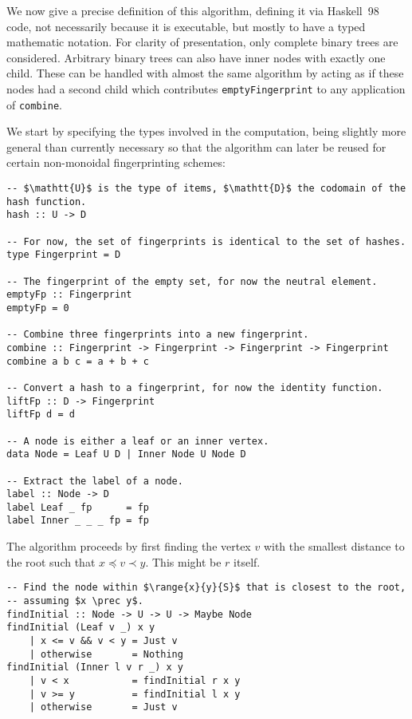 We now give a precise definition of this algorithm, defining it via Haskell~98~\cite{jones2003haskell} code, not necessarily because it is executable, but mostly to have a typed mathematic notation. For clarity of presentation, only complete binary trees are considered. Arbitrary binary trees can also have inner nodes with exactly one child. These can be handled with almost the same algorithm by acting as if these nodes had a second child which contributes \texttt{emptyFingerprint} to any application of \texttt{combine}.

We start by specifying the types involved in the computation, being slightly more general than currently necessary so that the algorithm can later be reused for certain non-monoidal fingerprinting schemes:

\begin{verbatim}
-- $\mathtt{U}$ is the type of items, $\mathtt{D}$ the codomain of the hash function.
hash :: U -> D

-- For now, the set of fingerprints is identical to the set of hashes.
type Fingerprint = D

-- The fingerprint of the empty set, for now the neutral element.
emptyFp :: Fingerprint
emptyFp = 0

-- Combine three fingerprints into a new fingerprint.
combine :: Fingerprint -> Fingerprint -> Fingerprint -> Fingerprint
combine a b c = a + b + c

-- Convert a hash to a fingerprint, for now the identity function.
liftFp :: D -> Fingerprint
liftFp d = d

-- A node is either a leaf or an inner vertex.
data Node = Leaf U D | Inner Node U Node D

-- Extract the label of a node.
label :: Node -> D
label Leaf _ fp      = fp
label Inner _ _ _ fp = fp
\end{verbatim}

The algorithm proceeds by first finding the vertex $v$ with the smallest distance to the root such that $x \preceq v \prec y$. This might be $r$ itself.

\begin{verbatim}
-- Find the node within $\range{x}{y}{S}$ that is closest to the root,
-- assuming $x \prec y$.
findInitial :: Node -> U -> U -> Maybe Node
findInitial (Leaf v _) x y
    | x <= v && v < y = Just v
    | otherwise       = Nothing
findInitial (Inner l v r _) x y
    | v < x           = findInitial r x y
    | v >= y          = findInitial l x y
    | otherwise       = Just v
\end{verbatim}

